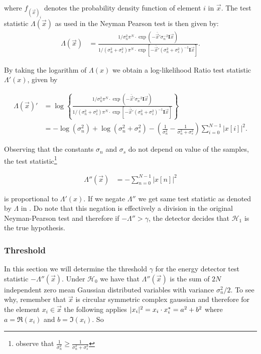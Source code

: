 \documentclass[a4paper, openany, oneside]{memoir}
\begin{document}
where $f_{(\vec{x})_i}$ denotes the probability density function of element $i$ in $\vec{x}$.  The test statistic $\Lambda(\vec{x})$ as used in the Neyman Pearson test is then given by:
\begin{align*}
\Lambda(\vec{x}) &=\frac{1/\sigma_n^2\pi^N \cdot \exp(-\bar{\vec{x}}'\sigma_n^{-2}\mathbf{I}\vec{x})}{1/(\sigma_n^2 + \sigma_s^2)\pi^N \cdot \exp[-\bar{\vec{x}}'(\sigma_n^2+\sigma_s^2)^{-1}\mathbf{I}\vec{x}]}.
\end{align*}


By taking the logarithm of $\Lambda(x)$ we obtain a log-likelihood Ratio test statistic $\Lambda'(x)$, given by

\begin{align}
\Lambda(\vec{x})' &= \log \left\{
\frac{1/\sigma_n^2\pi^N \cdot \exp(-\bar{\vec{x}}'\sigma_n^{-2}\mathbf{I}\vec{x})}{1/(\sigma_n^2 + \sigma_s^2)\pi^N \cdot \exp[-\bar{\vec{x}}'(\sigma_n^2+\sigma_s^2)^{-1}\mathbf{I}\vec{x}]}\right\} \\
&= -\log(\sigma_n^2) + \log(\sigma_n^2 + \sigma_s^2) -\left(\frac{1}{\sigma_n^2} - \frac{1}{\sigma_n^2 + \sigma_s^2 }\right)\sum_{i=0}^{N-1} |x[i]|^2.  \nonumber
\end{align}

Observing that the constants $\sigma_n$ and $\sigma_s$ do not depend on value of the samples, the test statistic\footnote{observe that $\frac{1}{\sigma_n^2} \geq \frac{1}{\sigma_n^2+\sigma_s^2}$}

\begin{align*}
\Lambda''(\vec{x}) &= -\sum_{n=0}^{N-1} |x[n]|^2
\end{align*} 

is proportional to $\Lambda'(x)$. If we negate $\Lambda''$ we get same test statistic as denoted by $\Lambda$ in . Do note that
this negation is effectively a division in the original Neyman-Pearson test and therefore if
$-\Lambda'' > \gamma$, the detector decides that $\mathcal{H}_1$ is the true hypothesis. 

\subsubsection{Threshold}
In this section we will determine the threshold $\gamma$ for the energy detector test statistic $-\Lambda''(\vec{x})$.
Under $\mathcal{H}_0$ we have that $\Lambda''(\vec{x})$ is the sum of $2N$ independent zero mean Gaussian distributed variables
with variance $\sigma_n^2/2$. To see why, remember that $\vec{x}$ is circular symmetric complex gaussian and therefore for the element $x_i \in \vec{x}$ the following applies
$|x_i|^2 = x_i \cdot x_i^* = a^2 + b^2$ where $a = \Re(x_i)$ and $b=\Im(x_i)$.  So
\end{document}
